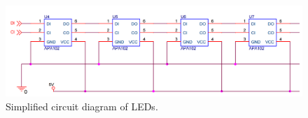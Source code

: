 \begin{figure}[H]
\begin{center}
\includegraphics[width=14cm]{Figures/leds_4.png}
\end{center}
\caption{Simplified circuit diagram of LEDs.}
\label{fig:leds_4}
\end{figure}
